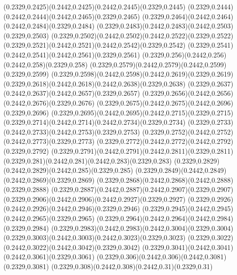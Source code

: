 (0.2329,0.2425)(0.2442,0.2425)(0.2442,0.2445)(0.2329,0.2445)
(0.2329,0.2444)(0.2442,0.2444)(0.2442,0.2465)(0.2329,0.2465)
(0.2329,0.2464)(0.2442,0.2464)(0.2442,0.2484)(0.2329,0.2484)
(0.2329,0.2483)(0.2442,0.2483)(0.2442,0.2503)(0.2329,0.2503)
(0.2329,0.2502)(0.2442,0.2502)(0.2442,0.2522)(0.2329,0.2522)
(0.2329,0.2521)(0.2442,0.2521)(0.2442,0.2542)(0.2329,0.2542)
(0.2329,0.2541)(0.2442,0.2541)(0.2442,0.2561)(0.2329,0.2561)
(0.2329,0.256)(0.2442,0.256)(0.2442,0.258)(0.2329,0.258)
(0.2329,0.2579)(0.2442,0.2579)(0.2442,0.2599)(0.2329,0.2599)
(0.2329,0.2598)(0.2442,0.2598)(0.2442,0.2619)(0.2329,0.2619)
(0.2329,0.2618)(0.2442,0.2618)(0.2442,0.2638)(0.2329,0.2638)
(0.2329,0.2637)(0.2442,0.2637)(0.2442,0.2657)(0.2329,0.2657)
(0.2329,0.2656)(0.2442,0.2656)(0.2442,0.2676)(0.2329,0.2676)
(0.2329,0.2675)(0.2442,0.2675)(0.2442,0.2696)(0.2329,0.2696)
(0.2329,0.2695)(0.2442,0.2695)(0.2442,0.2715)(0.2329,0.2715)
(0.2329,0.2714)(0.2442,0.2714)(0.2442,0.2734)(0.2329,0.2734)
(0.2329,0.2733)(0.2442,0.2733)(0.2442,0.2753)(0.2329,0.2753)
(0.2329,0.2752)(0.2442,0.2752)(0.2442,0.2773)(0.2329,0.2773)
(0.2329,0.2772)(0.2442,0.2772)(0.2442,0.2792)(0.2329,0.2792)
(0.2329,0.2791)(0.2442,0.2791)(0.2442,0.2811)(0.2329,0.2811)
(0.2329,0.281)(0.2442,0.281)(0.2442,0.283)(0.2329,0.283)
(0.2329,0.2829)(0.2442,0.2829)(0.2442,0.285)(0.2329,0.285)
(0.2329,0.2849)(0.2442,0.2849)(0.2442,0.2869)(0.2329,0.2869)
(0.2329,0.2868)(0.2442,0.2868)(0.2442,0.2888)(0.2329,0.2888)
(0.2329,0.2887)(0.2442,0.2887)(0.2442,0.2907)(0.2329,0.2907)
(0.2329,0.2906)(0.2442,0.2906)(0.2442,0.2927)(0.2329,0.2927)
(0.2329,0.2926)(0.2442,0.2926)(0.2442,0.2946)(0.2329,0.2946)
(0.2329,0.2945)(0.2442,0.2945)(0.2442,0.2965)(0.2329,0.2965)
(0.2329,0.2964)(0.2442,0.2964)(0.2442,0.2984)(0.2329,0.2984)
(0.2329,0.2983)(0.2442,0.2983)(0.2442,0.3004)(0.2329,0.3004)
(0.2329,0.3003)(0.2442,0.3003)(0.2442,0.3023)(0.2329,0.3023)
(0.2329,0.3022)(0.2442,0.3022)(0.2442,0.3042)(0.2329,0.3042)
(0.2329,0.3041)(0.2442,0.3041)(0.2442,0.3061)(0.2329,0.3061)
(0.2329,0.306)(0.2442,0.306)(0.2442,0.3081)(0.2329,0.3081)
(0.2329,0.308)(0.2442,0.308)(0.2442,0.31)(0.2329,0.31)
